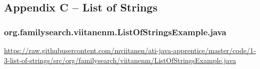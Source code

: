 \subsection*{Appendix C -- List of Strings} \label{App:AppendixC}

\subsubsection*{org.familysearch.viitanenm.ListOfStringsExample.java}
\noindent
\begin{minipage}{.6in}
\end{minipage}
\begin{minipage}{6in}
  \url{https://raw.githubusercontent.com/mviitanen/ati-java-apprentice/master/code/1-3-list-of-strings/src/org/familysearch/viitanenm/ListOfStringsExample.java}
\end{minipage}